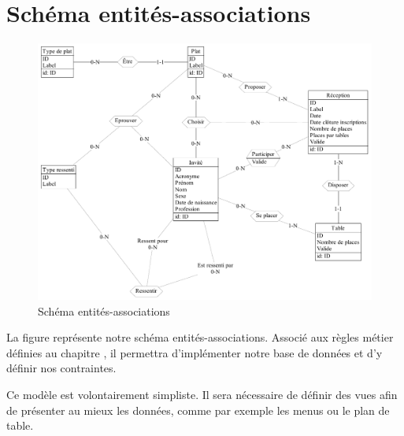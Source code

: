 \chapter{Schéma entités-associations}

\begin{figure}
  \centering
  \includegraphics[width=\textwidth]{IMG/ea}
  \caption{Schéma entités-associations}
  \label{img_ea}
\end{figure}

La figure  représente notre schéma entités-associations. Associé aux règles métier définies au chapitre , il permettra d'implémenter notre base de données et d'y définir nos contraintes.

Ce modèle est volontairement simpliste. Il sera nécessaire de définir des vues afin de présenter au mieux les données, comme par exemple les menus ou le plan de table.